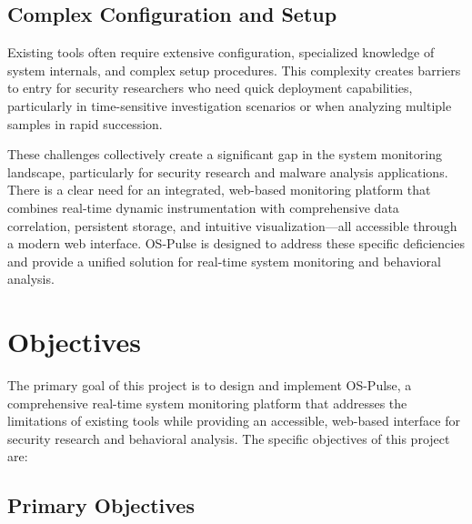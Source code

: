 \subsection*{Complex Configuration and Setup}
Existing tools often require extensive configuration, specialized knowledge of system internals, and complex setup procedures. This complexity creates barriers to entry for security researchers who need quick deployment capabilities, particularly in time-sensitive investigation scenarios or when analyzing multiple samples in rapid succession.

These challenges collectively create a significant gap in the system monitoring landscape, particularly for security research and malware analysis applications. There is a clear need for an integrated, web-based monitoring platform that combines real-time dynamic instrumentation with comprehensive data correlation, persistent storage, and intuitive visualization—all accessible through a modern web interface. OS-Pulse is designed to address these specific deficiencies and provide a unified solution for real-time system monitoring and behavioral analysis.

\section{Objectives}

The primary goal of this project is to design and implement OS-Pulse, a comprehensive real-time system monitoring platform that addresses the limitations of existing tools while providing an accessible, web-based interface for security research and behavioral analysis. The specific objectives of this project are:

\subsection*{Primary Objectives}

